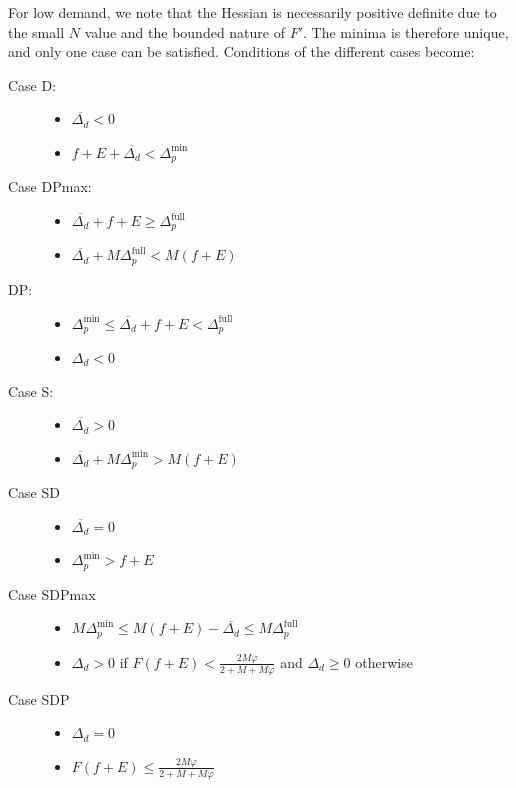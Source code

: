 \documentclass[english, a4paper]{article}
\theoremstyle{plain}
\theoremstyle{definition}
\theoremstyle{remark}
\begin{document}
For low demand, we note that the Hessian is necessarily positive definite due to the small $N$ value and the bounded nature of $F'$. The minima is therefore unique, and only one case can be satisfied. Conditions of the different cases become:\begin{description}
    \item[Case D:] \begin{itemize}
        \item $\overline{\Delta_d} < 0$
        \item $f + E + \overline{\Delta_d} < \Delta_p^{\text{min}}$
    \end{itemize}
    \item[Case DPmax:]\begin{itemize}
        \item $\overline{\Delta_d} + f + E \geq \Delta_p^{\text{full}}$
        \item $\overline{\Delta_d} + M\Delta_p^{\text{full}} < M(f + E)$
    \end{itemize}
    \item[DP:]\begin{itemize}
        \item $\Delta_p^{\text{min}} \leq \overline{\Delta_d} + f + E < \Delta_p^{\text{full}}$
        \item $\Delta_d < 0$
    \end{itemize}
    \item[Case S:]\begin{itemize}
        \item $\overline{\Delta_d} > 0$
        \item $\overline{\Delta_d} + M \Delta_p^{\text{min}} > M(f + E)$
    \end{itemize}
    \item[Case SD]\begin{itemize}
        \item $\overline{\Delta_d} = 0$
        \item $\Delta_p^{\text{min}} > f + E$
    \end{itemize}
    \item[Case SDPmax]\begin{itemize}
        \item $M\Delta_p^{\text{min}} \leq M(f + E) - \overline{\Delta_d} \leq M\Delta_p^{\text{full}}$
        \item $\Delta_d > 0$ if $F(f + E) < \frac{2M\varphi}{2 + M + M\varphi}$ and $\Delta_d \geq 0$ otherwise
    \end{itemize}
    \item[Case SDP]\begin{itemize}
        \item $\Delta_d = 0$
        \item $F(f + E)\leq \frac{2M\varphi}{2 + M + M\varphi}$
    \end{itemize}
\end{description}
\end{document}

